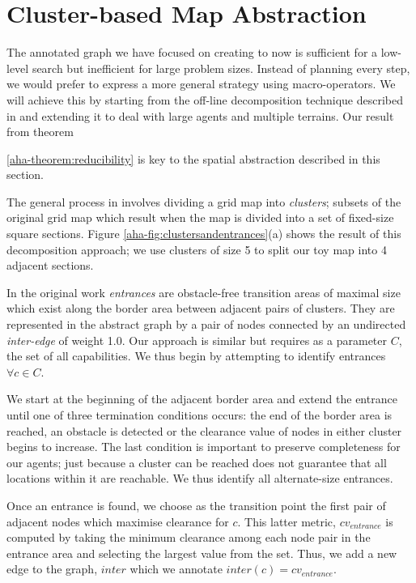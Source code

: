 \section{Cluster-based Map Abstraction}
\label{aha:mapabstraction}
The annotated graph we have focused on creating to now is sufficient for a low-level search but inefficient for large problem sizes. 
Instead of planning every step, we would prefer to express a more general strategy using macro-operators.
We will achieve this by starting from the off-line decomposition technique described in \cite{botea04} and extending it to deal with large agents and multiple terrains. 
Our result from theorem {\ref{aha-theorem:reducibility} is key to the spatial abstraction described in this section. 
\par \indent
The general process in \cite{botea04} involves dividing a grid map into \emph{clusters}; subsets of the original grid map which result when the map is divided into a set of fixed-size square sections. Figure \ref{aha-fig:clustersandentrances}(a) shows the result of this decomposition approach; we use clusters of size 5 to split our toy map into 4 adjacent sections.
\par \indent
In the original work \emph{entrances} are obstacle-free transition areas of maximal size which exist along the border area between adjacent pairs of clusters. They are represented in the abstract graph by a pair of nodes connected by an undirected \emph{inter-edge} of weight 1.0. 
Our approach is similar but requires as a parameter $C$, the set of all capabilities. 
We thus begin by attempting to identify entrances $\forall c \in C$. 
\par \indent
We start at the beginning of the adjacent border area and extend the entrance until one of three termination conditions occurs: the end of the border area is reached, an obstacle is detected or the clearance value of nodes in either cluster begins to increase. 
The last condition is important to preserve completeness for our agents; just because a cluster can be reached does not guarantee that all locations within it are reachable. 
We thus identify all alternate-size entrances.
\par \indent
Once an entrance is found, we choose as the transition point the first pair of adjacent nodes which maximise clearance for $c$. 
This latter metric, $cv_{entrance}$ is computed by taking the minimum clearance among each node pair in the entrance area and selecting the largest value from the set. Thus, we add a new edge to the graph, $inter$ which we annotate $inter(c) = cv_{entrance}$. 
}
